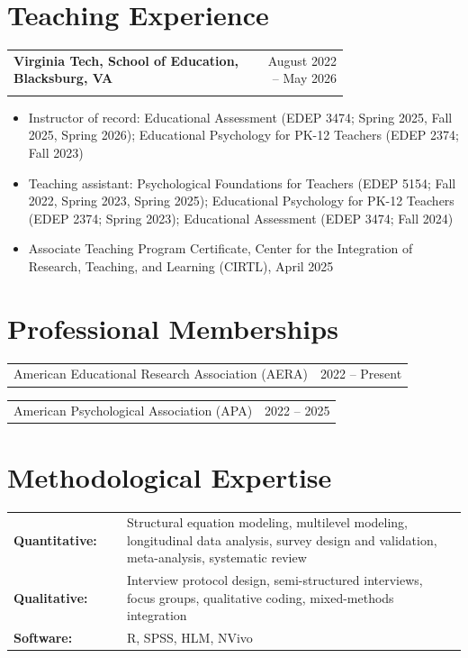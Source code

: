 \documentclass[letterpaper,11pt]{article}
\makeatletter
\newcommand{\entry}[3]{%
  \begin{tabular*}{\linewidth}[t]{@{}>{\raggedright\arraybackslash}p{0.74\linewidth}@{\extracolsep{\fill}}r@{}}
    \textbf{#1} & #2 \\
    \multicolumn{2}{@{}l@{}}{\textit{#3}} \\
  \end{tabular*}\par\vspace{1pt}}
\newcommand{\oneline}[2]{%
  \begin{tabular*}{\linewidth}[t]{@{}l@{\extracolsep{\fill}}r@{}}
    #1 & #2 \\
  \end{tabular*}\par}
\newenvironment{bullets}%
  {\begin{itemize}[leftmargin=1.2em, itemsep=1pt, parsep=0pt, topsep=1pt, label=\textbullet]}%
  {\end{itemize}\vspace{4pt}}
\makeatother
\begin{document}
\section{Teaching Experience}
\entry{Virginia Tech, School of Education, Blacksburg, VA}{August 2022 -- May 2026}
      {Instructor of Record and Graduate Teaching Assistant}
\begin{bullets}
  \item Instructor of record: Educational Assessment (EDEP 3474; Spring 2025, Fall 2025, Spring 2026); Educational Psychology for PK-12 Teachers (EDEP 2374; Fall 2023)
  \item Teaching assistant: Psychological Foundations for Teachers (EDEP 5154; Fall 2022, Spring 2023, Spring 2025); Educational Psychology for PK-12 Teachers (EDEP 2374; Spring 2023); Educational Assessment (EDEP 3474; Fall 2024)
  \item Associate Teaching Program Certificate, Center for the Integration of Research, Teaching, and Learning (CIRTL), April 2025
\end{bullets}

\section{Professional Memberships}
\oneline{American Educational Research Association (AERA)}{2022 -- Present}
\oneline{American Psychological Association (APA)}{2022 -- 2025}

\section{Methodological Expertise}
\begin{tabular*}{\linewidth}{@{}p{0.25\linewidth}>{\raggedright\arraybackslash}p{0.75\linewidth}@{}}
  \textbf{Quantitative:}   & Structural equation modeling, multilevel modeling, longitudinal data analysis, survey design and validation, meta-analysis, systematic review \\[2pt]
  \textbf{Qualitative:}    & Interview protocol design, semi-structured interviews, focus groups, qualitative coding, mixed-methods integration \\[2pt]
  \textbf{Software:}       & R, SPSS, HLM, NVivo \\
\end{tabular*}
\end{document}
